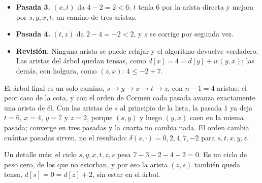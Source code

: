 \documentclass[11pt,letterpaper]{article}
\begin{document}
\begin{ejemplo}
\begin{itemize}[itemsep=0.1em]
          en la misma pasada, $(y, x)$ lo baja a $4$. $(t, z)$ pone
          $z$ en $2$, que todavía no es su valor final.
    \item \textbf{Pasada 3.} $(x, t)$ da $4 - 2 = 2 < 6$: $t$ tenía
          $6$ por la arista directa y mejora por $s, y, x, t$, un
          camino de tres aristas.
    \item \textbf{Pasada 4.} $(t, z)$ da $2 - 4 = -2 < 2$, y $z$ se
          corrige por segunda vez.
    \item \textbf{Revisión.} Ninguna arista se puede relajar y el
          algoritmo devuelve verdadero. Las aristas del árbol quedan
          tensas, como $d[x] = 4 = d[y] + w(y, x)$; las demás, con
          holgura, como $(z, x)$: $4 \le -2 + 7$.
  \end{itemize}
  El árbol final es un solo camino, $s \to y \to x \to t \to z$, con
  $n - 1 = 4$ aristas: el peor caso de la cota, y con el orden de
  Cormen cada pasada avanza exactamente una arista de él. Con las
  aristas de $s$ al principio de la lista, la pasada 1 ya deja
  $t = 6$, $x = 4$, $y = 7$ y $z = 2$, porque $(s, y)$ y luego
  $(y, x)$ caen en la misma pasada; converge en tres pasadas y la
  cuarta no cambia nada. El orden cambia cuántas pasadas sirven, no
  el resultado: $\delta(s, \cdot) = 0, 2, 4, 7, -2$ para
  $s, t, x, y, z$.

  Un detalle más: el ciclo $s, y, x, t, z, s$ pesa
  $7 - 3 - 2 - 4 + 2 = 0$. Es un ciclo de peso cero, de los que no
  estorban, y por eso la arista $(z, s)$ también queda tensa,
  $d[s] = 0 = d[z] + 2$, sin estar en el árbol.
\end{ejemplo}
\end{document}
